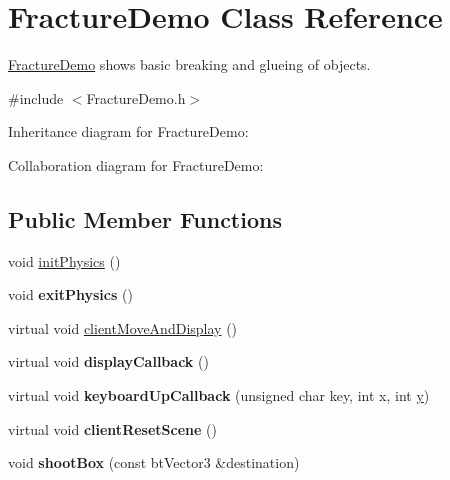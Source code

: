 \hypertarget{class_fracture_demo}{\section{Fracture\+Demo Class Reference}
\label{class_fracture_demo}
}


\hyperlink{class_fracture_demo}{Fracture\+Demo} shows basic breaking and glueing of objects.  




{\ttfamily \#include $<$Fracture\+Demo.\+h$>$}



Inheritance diagram for Fracture\+Demo\+:


Collaboration diagram for Fracture\+Demo\+:
\subsection*{Public Member Functions}
\begin{DoxyCompactItemize}
\item 
void \hyperlink{class_fracture_demo_a55fd14aec70a8cc81b363b69fb251e7a}{init\+Physics} ()
\item 
\hypertarget{class_fracture_demo_a5b4d8b678f718fe0f2d614453256fec5}{void {\bfseries exit\+Physics} ()}\label{class_fracture_demo_a5b4d8b678f718fe0f2d614453256fec5}

\item 
virtual void \hyperlink{class_fracture_demo_a4254a2386f19bc3e6a68da9f09e9ad95}{client\+Move\+And\+Display} ()
\item 
\hypertarget{class_fracture_demo_a8965dbe5e23409f691feeb5e0d95bbcd}{virtual void {\bfseries display\+Callback} ()}\label{class_fracture_demo_a8965dbe5e23409f691feeb5e0d95bbcd}

\item 
\hypertarget{class_fracture_demo_a270b3fe13f1febcc448cd69289d1a1bb}{virtual void {\bfseries keyboard\+Up\+Callback} (unsigned char key, int x, int \hyperlink{_ice_utils_8h_aa7ffaed69623192258fb8679569ff9ba}{y})}\label{class_fracture_demo_a270b3fe13f1febcc448cd69289d1a1bb}

\item 
\hypertarget{class_fracture_demo_af3481ec6299b4db19aa10a56b98fc98b}{virtual void {\bfseries client\+Reset\+Scene} ()}\label{class_fracture_demo_af3481ec6299b4db19aa10a56b98fc98b}

\item 
\hypertarget{class_fracture_demo_ad0369cb9f1e7ccc7f33f7751ca9ec19b}{void {\bfseries shoot\+Box} (const bt\+Vector3 \&destination)}\label{class_fracture_demo_ad0369cb9f1e7ccc7f33f7751ca9ec19b}

\end{DoxyCompactItemize}
